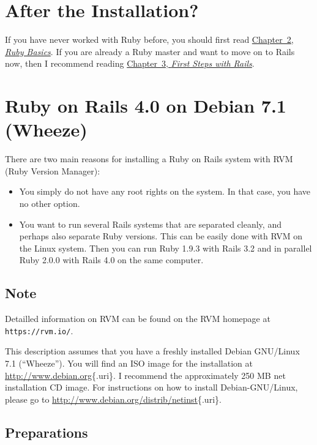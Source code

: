 \documentclass[a4paper]{book}
\begin{document}
\section{After the Installation?}\label{after-the-installation}

If you have never worked with Ruby before, you should first read \hyperref[ruby-grundlagen]{Chapter~2, \emph{Ruby Basics}}. If you are already a Ruby master and want to move on to Rails now, then I recommend reading \hyperref[ersteux5fschritteux5fmitux5frails]{Chapter~3, \emph{First Steps with Rails}}.

\section{Ruby on Rails 4.0 on Debian 7.1 (Wheeze)}\label{ruby-on-rails-4.0-on-debian-7.1-wheeze}

There are two main reasons for installing a Ruby on Rails system with RVM (Ruby Version Manager):

\begin{itemize}
\itemsep1pt\parskip0pt
\item
  You simply do not have any root rights on the system. In that case, you have no other option.
\item
  You want to run several Rails systems that are separated cleanly, and perhaps also separate Ruby versions. This can be easily done with RVM on the Linux system. Then you can run Ruby 1.9.3 with Rails 3.2 and in parallel Ruby 2.0.0 with Rails 4.0 on the same computer.
\end{itemize}

\subsection{Note}\label{note}

Detailled information on RVM can be found on the RVM homepage at \texttt{https://rvm.io/}.

This description assumes that you have a freshly installed Debian GNU/Linux 7.1 (“Wheeze”). You will find an ISO image for the installation at \url{http://www.debian.org}\{.uri\}. I recommend the approximately 250 MB net installation CD image. For instructions on how to install Debian-GNU/Linux, please go to \url{http://www.debian.org/distrib/netinst}\{.uri\}.

\subsection{Preparations}\label{preparations}
\end{document}
